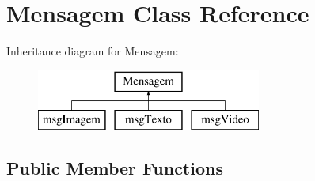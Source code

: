 \hypertarget{class_mensagem}{}\section{Mensagem Class Reference}
\label{class_mensagem}
Inheritance diagram for Mensagem\+:\begin{figure}[H]
\begin{center}
\leavevmode
\includegraphics[height=2.000000cm]{class_mensagem}
\end{center}
\end{figure}
\subsection*{Public Member Functions}
